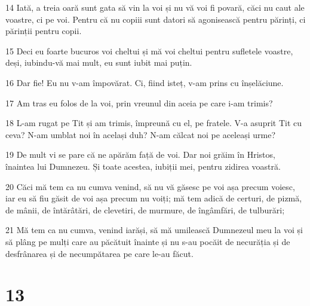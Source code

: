 \par 14 Iată, a treia oară sunt gata să vin la voi și nu vă voi fi povară, căci nu caut ale voastre, ci pe voi. Pentru că nu copiii sunt datori să agonisească pentru părinți, ci părinții pentru copii.
\par 15 Deci eu foarte bucuros voi cheltui și mă voi cheltui pentru sufletele voastre, deși, iubindu-vă mai mult, eu sunt iubit mai puțin.
\par 16 Dar fie! Eu nu v-am împovărat. Ci, fiind isteț, v-am prins cu înșelăciune.
\par 17 Am tras eu folos de la voi, prin vreunul din aceia pe care i-am trimis?
\par 18 L-am rugat pe Tit și am trimis, împreună cu el, pe fratele. V-a asuprit Tit cu ceva? N-am umblat noi în același duh? N-am călcat noi pe aceleași urme?
\par 19 De mult vi se pare că ne apărăm față de voi. Dar noi grăim în Hristos, înaintea lui Dumnezeu. Și toate acestea, iubiții mei, pentru zidirea voastră.
\par 20 Căci mă tem ca nu cumva venind, să nu vă găsesc pe voi așa precum voiesc, iar eu să fiu găsit de voi așa precum nu voiți; mă tem adică de certuri, de pizmă, de mânii, de întărâtări, de clevetiri, de murmure, de îngâmfări, de tulburări;
\par 21 Mă tem ca nu cumva, venind iarăși, să mă umilească Dumnezeul meu la voi și să plâng pe mulți care au păcătuit înainte și nu s-au pocăit de necurăția și de desfrânarea și de necumpătarea pe care le-au făcut.

\chapter{13}

